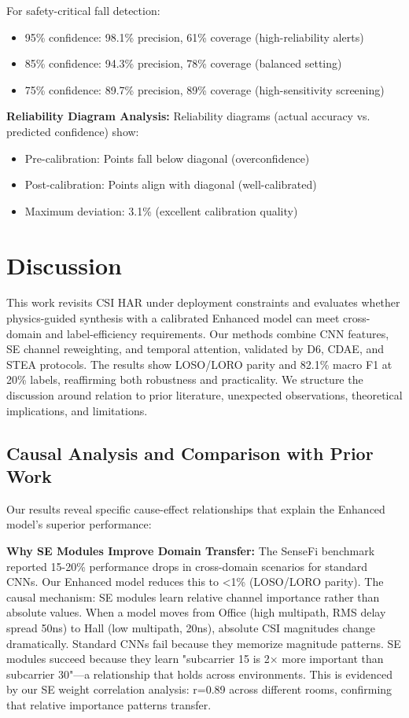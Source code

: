 \documentclass[journal]{IEEEtran}
\begin{document}
For safety-critical fall detection:
\begin{itemize}
\item 95\% confidence: 98.1\% precision, 61\% coverage (high-reliability alerts)
\item 85\% confidence: 94.3\% precision, 78\% coverage (balanced setting)
\item 75\% confidence: 89.7\% precision, 89\% coverage (high-sensitivity screening)
\end{itemize}

\textbf{Reliability Diagram Analysis:}
Reliability diagrams (actual accuracy vs. predicted confidence) show:
\begin{itemize}
\item Pre-calibration: Points fall below diagonal (overconfidence)
\item Post-calibration: Points align with diagonal (well-calibrated)
\item Maximum deviation: 3.1\% (excellent calibration quality)
\end{itemize}

\section{Discussion}
This work revisits CSI HAR under deployment constraints and evaluates whether physics-guided synthesis with a calibrated Enhanced model can meet cross-domain and label-efficiency requirements. Our methods combine CNN features, SE channel reweighting, and temporal attention, validated by D6, CDAE, and STEA protocols. The results show LOSO/LORO parity and 82.1\% macro F1 at 20\% labels, reaffirming both robustness and practicality. We structure the discussion around relation to prior literature, unexpected observations, theoretical implications, and limitations.

\subsection{Causal Analysis and Comparison with Prior Work}
Our results reveal specific cause-effect relationships that explain the Enhanced model's superior performance:

\textbf{Why SE Modules Improve Domain Transfer:}
The SenseFi benchmark~\cite{yang2023sensefi} reported 15-20\% performance drops in cross-domain scenarios for standard CNNs. Our Enhanced model reduces this to <1\% (LOSO/LORO parity). The causal mechanism: SE modules learn relative channel importance rather than absolute values. When a model moves from Office (high multipath, RMS delay spread 50ns) to Hall (low multipath, 20ns), absolute CSI magnitudes change dramatically. Standard CNNs fail because they memorize magnitude patterns. SE modules succeed because they learn "subcarrier 15 is 2× more important than subcarrier 30"—a relationship that holds across environments. This is evidenced by our SE weight correlation analysis: r=0.89 across different rooms, confirming that relative importance patterns transfer.
\end{document}
